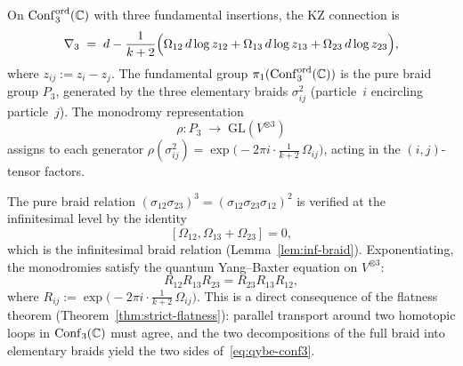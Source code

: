 \begin{computation}
\label{comp:conf3-yang-baxter}
On $\mathrm{Conf}_3^{\mathrm{ord}}(\mathbb C)$ with three fundamental insertions, the KZ connection is
\[
 \nabla_3 \;=\; d - \frac{1}{k+2}\Bigl(
 \Omega_{12}\,d\log z_{12}+\Omega_{13}\,d\log z_{13}+\Omega_{23}\,d\log z_{23}
 \Bigr),
\]
where $z_{ij}:=z_i-z_j$. The fundamental group
$\pi_1(\mathrm{Conf}_3^{\mathrm{ord}}(\mathbb C))$ is the pure braid group $P_3$,
generated by the three elementary braids $\sigma_{ij}^2$
(particle~$i$ encircling particle~$j$). The monodromy representation
\[
 \rho\colon P_3\;\longrightarrow\; \mathrm{GL}(V^{\otimes 3})
\]
assigns to each generator
$\rho(\sigma_{ij}^2) = \exp\!\bigl(-2\pi i\cdot\tfrac{1}{k+2}\,\Omega_{ij}\bigr)$,
acting in the $(i,j)$-tensor factors.

The pure braid relation $(\sigma_{12}\sigma_{23})^3=(\sigma_{12}\sigma_{23}\sigma_{12})^2$
is verified at the infinitesimal level by the identity
\begin{equation}\label{eq:inf-braid-yb}
 [\Omega_{12},\Omega_{13}+\Omega_{23}]=0,
\end{equation}
which is the infinitesimal braid relation (Lemma~\ref{lem:inf-braid}).
Exponentiating, the monodromies satisfy the quantum Yang--Baxter equation
on $V^{\otimes 3}$:
\begin{equation}\label{eq:qybe-conf3}
 R_{12}R_{13}R_{23}=R_{23}R_{13}R_{12},
\end{equation}
where $R_{ij}:=\exp\!\bigl(-2\pi i\cdot\frac{1}{k+2}\,\Omega_{ij}\bigr)$.
This is a direct consequence of the flatness theorem
(Theorem~\ref{thm:strict-flatness}): parallel transport around two
homotopic loops in $\mathrm{Conf}_3(\mathbb C)$ must agree, and the two decompositions
of the full braid into elementary braids yield the two sides
of~\eqref{eq:qybe-conf3}.
\end{computation}

